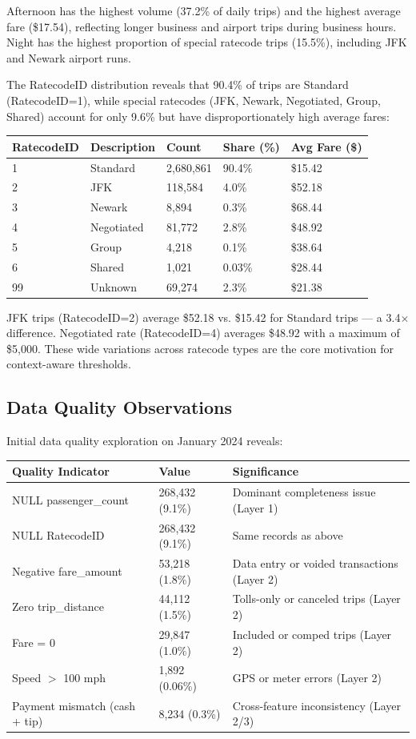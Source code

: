 Afternoon has the highest volume (37.2\% of daily trips) and the highest average fare (\$17.54), reflecting longer business and airport trips during business hours. Night has the highest proportion of special ratecode trips (15.5\%), including JFK and Newark airport runs.

The RatecodeID distribution reveals that 90.4\% of trips are Standard (RatecodeID=1), while special ratecodes (JFK, Newark, Negotiated, Group, Shared) account for only 9.6\% but have disproportionately high average fares:

\begin{longtable}{|m{3cm}|m{3cm}|m{3cm}|m{3cm}|m{3cm}|}
\hline
\textbf{RatecodeID} & \textbf{Description} & \textbf{Count} & \textbf{Share (\%)} & \textbf{Avg Fare (\$)} \\ \hline
1 & Standard & 2,680,861 & 90.4\% & \$15.42 \\ \hline
2 & JFK & 118,584 & 4.0\% & \$52.18 \\ \hline
3 & Newark & 8,894 & 0.3\% & \$68.44 \\ \hline
4 & Negotiated & 81,772 & 2.8\% & \$48.92 \\ \hline
5 & Group & 4,218 & 0.1\% & \$38.64 \\ \hline
6 & Shared & 1,021 & 0.03\% & \$28.44 \\ \hline
99 & Unknown & 69,274 & 2.3\% & \$21.38 \\ \hline
\end{longtable}

JFK trips (RatecodeID=2) average \$52.18 vs. \$15.42 for Standard trips --- a 3.4$\times$ difference. Negotiated rate (RatecodeID=4) averages \$48.92 with a maximum of \$5,000. These wide variations across ratecode types are the core motivation for context-aware thresholds.

\subsection{Data Quality Observations}

Initial data quality exploration on January 2024 reveals:

\begin{longtable}{|m{4cm}|m{3cm}|m{4cm}|}
\hline
\textbf{Quality Indicator} & \textbf{Value} & \textbf{Significance} \\ \hline
NULL passenger\_count & 268,432 (9.1\%) & Dominant completeness issue (Layer 1) \\ \hline
NULL RatecodeID & 268,432 (9.1\%) & Same records as above \\ \hline
Negative fare\_amount & 53,218 (1.8\%) & Data entry or voided transactions (Layer 2) \\ \hline
Zero trip\_distance & 44,112 (1.5\%) & Tolls-only or canceled trips (Layer 2) \\ \hline
Fare = 0 & 29,847 (1.0\%) & Included or comped trips (Layer 2) \\ \hline
Speed $>$ 100 mph & 1,892 (0.06\%) & GPS or meter errors (Layer 2) \\ \hline
Payment mismatch (cash + tip) & 8,234 (0.3\%) & Cross-feature inconsistency (Layer 2/3) \\ \hline
\end{longtable}

